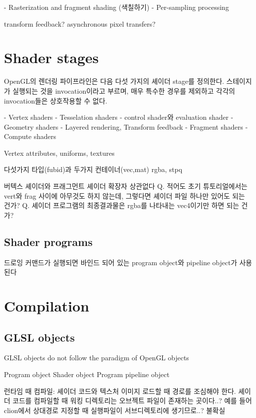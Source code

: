 \documentclass[a4paper]{report}
\begin{document}
- Rasterization and fragment shading (색칠하기)
- Per-sampling processing









transform feedback?
asynchronous pixel transfers?


\section{Shader stages}

OpenGL의 렌더링 파이프라인은 다음 다섯 가지의 셰이더 stage를 정의한다.
스테이지가 실행되는 것을 invocation이라고 부르며, 매우 특수한 경우를 제외하고 각각의 invocation들은 상호작용할 수 없다.

- Vertex shaders
- Tesselation shaders
  - control shader와 evaluation shader
- Geometry shaders
  - Layered rendering, Transform feedback
- Fragment shaders
- Compute shaders

Vertex attributes, uniforms, textures

다섯가지 타입(fubid)과 두가지 컨테이너(vec,mat)
rgba, stpq

버텍스 셰이더와 프래그먼트 셰이더 확장자 상관없다
Q. 적어도 초기 튜토리얼에서는 vert와 frag 사이에 아무것도 하지 않는데, 그렇다면 셰이더 파일 하나만 있어도 되는 건가?
Q. 셰이더 프로그램의 최종결과물은 rgba를 나타내는 vec4이기만 하면 되는 건가?


\subsection{Shader programs}

드로잉 커맨드가 실행되면 바인드 되어 있는 program object와 pipeline object가 사용된다




\section{Compilation}

\subsection{GLSL objects}
GLSL objects do not follow the paradigm of OpenGL objects

Program object
Shader object
Program pipeline object

런타임 때 컴파일:
셰이더 코드와 텍스처 이미지 로드할 때 경로를 조심해야 한다.
셰이더 코드를 컴파일할 때 워킹 디렉토리는 오브젝트 파일이 존재하는 곳이다..?
예를 들어 clion에서 상대경로 지정할 때 실행파일이 서브디렉토리에 생기므로..?
불확실
\end{document}
